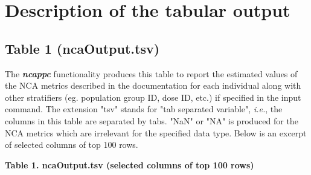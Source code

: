 \documentclass[pdflatex, a4paper, 11pt]{article}\usepackage[]{graphicx}\usepackage[]{color}
\numberwithin{equation}{section}
\numberwithin{figure}{section}
\numberwithin{table}{section}
\begin{document}
\newpage
\footnotesize
\section{Description of the tabular output}

\begin{sloppypar}

\subsection{Table 1 (ncaOutput.tsv)}
The \textbf{\textit{ncappc}} functionality produces this table to report the estimated values of the NCA metrics described in the documentation for each individual along with other stratifiers (eg. population group ID, dose ID, etc.) if specified in the input command. The extension "tsv" stands for "tab separated variable", \textit{i.e.}, the columns in this table are separated by tabs. "NaN" or "NA" is produced for the NCA metrics which are irrelevant for the specified data type. Below is an excerpt of selected columns of top 100 rows.


\begin{center}
\textbf{Table 1. ncaOutput.tsv (selected columns of top 100 rows)}


\end{center}

% 

\footnotesize

\end{sloppypar}
\end{document}
